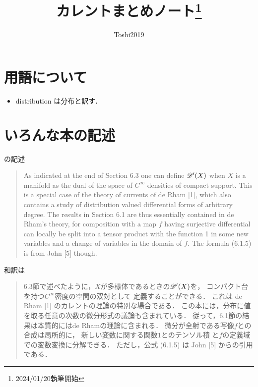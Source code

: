 





\title{カレントまとめノート\footnote{2024/01/20執筆開始}}
\author{Toshi2019}

\maketitle

\section*{用語について}

\begin{itemize}
    \item distribution は分布と訳す．
\end{itemize}
\section{いろんな本の記述}
\cite[Chap.6. Notes]{Hor89}の記述
\begin{quotation}
    As indicated at the end of Section 6.3 
    one can define \(\mathscr{D}'(X)\) when \(X\) is a manifold 
    as the dual of the space of \(C^\infty\) densities 
    of compact support. 
    This is a special case of the theory of currents 
    of de Rham [1], 
    which also contains a study of 
    distribution valued differential forms of arbitrary degree. 
    The results in Section 6.1 are thus essentially 
    contained in de Rham's theory, 
    for composition with a map \(f\) having 
    surjective differential can locally be split into 
    a tensor product with the function 1 
    in some new variables and a change of variables 
    in the domain of \(f\). 
    The formula (6.1.5) is from John [5] though. 
\end{quotation}

和訳は
\begin{quotation}
    6.3節で述べたように，\(X\)が多様体であるときの\(\mathscr{D}'(X)\)を，
    コンパクト台を持つ\(C^\infty\)密度の空間の双対として
    定義することができる．
    これは de Rham [1] のカレントの理論の特別な場合である．
    この本には，分布に値を取る任意の次数の微分形式の議論も含まれている．
    従って，6.1節の結果は本質的にはde Rhamの理論に含まれる．
    微分が全射である写像\(f\)との合成は局所的に，
    新しい変数に関する関数\(1\)とのテンソル積
    と\(f\)の定義域での変数変換に分解できる．
    ただし，公式 (6.1.5) は John [5] からの引用である．
\end{quotation}

